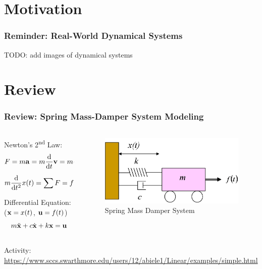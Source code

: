 \documentclass[aspectratio=169]{beamer}
\begin{document}
\section{Motivation}
\begin{frame}
	\frametitle{Reminder: Real-World Dynamical Systems}

	
	
	TODO: add images of dynamical systems

\end{frame}


\section{Review}
\begin{frame}
	\frametitle{Review: Spring Mass-Damper System Modeling}
	\begin{columns}
		\begin{column}{0.5 \textwidth}
			Newton's 2\textsuperscript{nd} Law:
			\[
				F = m \vb{a} 
				= m \dv{t} \vb{v} 
				= m \dv{t} \qty(\dv{t} \vb{x})
			\]
			\pause
			\[
				m \dv{t^2} x(t) 
				= \sum F 
				= f(t) - b \dv{t} x(t) - k x(t)
			\] 
			\vspace{1em}

			\pause{}
			Differential Equation: ($\vb{x} = x(t)$, $\vb{u} = f(t)$)
			\[
				m \ddot{\vb{x}} + c \dot{\vb{x}} + k \vb{x} = \vb{u}
			\]
		\end{column}
		\begin{column}{0.375 \textwidth}
			\onslide<1->
			\begin{figure}
				\includegraphics[width=\textwidth]{Images/SpringMassDamper_cartSystem.png}
				Spring Mass Damper System \cite{ctms_engin_umich_SystemModeling}
			\end{figure}
		\end{column}
	\end{columns}
	
	\footnotesize{
		Activity: 
		\url{https://www.sccs.swarthmore.edu/users/12/abiele1/Linear/examples/simple.html}
	}
\end{frame}
\end{document}

